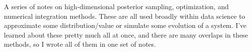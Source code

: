 A series of notes on high-dimensional posterior sampling, optimization, and numerical integration methods. These are all used broadly within data science to approximate some distribution/value or simulate some evolution of a system. I've learned about these pretty much all at once, and there are many overlaps in these methods, so I wrote all of them in one set of notes. 

